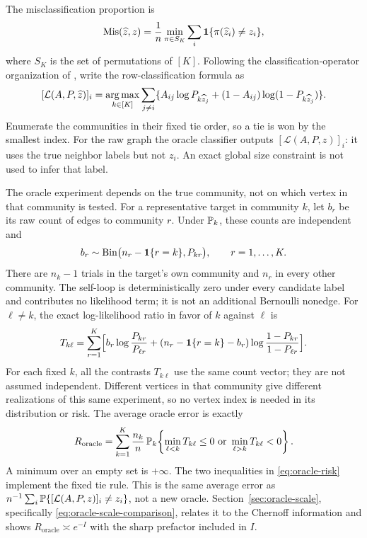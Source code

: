 The misclassification proportion is
\[
 \operatorname{Mis}(\widehat z,z)=\frac1n\min_{\pi\in S_K}
     \sum_i\mathbf1\{\pi(\widehat z_i)\ne z_i\},
\]
where $S_K$ is the set of permutations of $[K]$.
Following the classification-operator organization of \citet{zhouli},
write the row-classification formula as
\begin{equation}\label{eq:sbm-oracle}
 [\mathcal L(A,P,\widehat z)]_i
 =\operatorname*{arg\,max}_{k\in[K]}\sum_{j\ne i}
   \{A_{ij}\log P_{k\widehat z_j}+(1-A_{ij})\log(1-P_{k\widehat z_j})\}.
\end{equation}
Enumerate the communities in their fixed tie order, so a tie is won
by the smallest index. For the raw graph the oracle classifier outputs
$[\mathcal L(A,P,z)]_i$: it uses the true neighbor labels but not
$z_i$. An exact global size constraint is not used to infer that label.

The oracle experiment depends on the true community, not on which
vertex in that community is tested. For a representative target in
community $k$, let $b_{r}$ be its raw count of edges to community
$r$. Under $\mathbb P_k$, these counts are independent and
\[
 b_{r}\sim\operatorname{Bin}
       \bigl(n_{r}-\mathbf1\{r=k\},P_{kr}\bigr),
 \qquad r=1,\ldots,K.
\]
There are $n_k-1$ trials in the target's own community and $n_{r}$
in every other community. The self-loop is deterministically zero
under every candidate label and contributes no likelihood term; it
is not an additional Bernoulli nonedge. For $\ell\ne k$, the exact
log-likelihood ratio in favor of $k$ against $\ell$ is
\[
T_{k\ell}=\sum_{r=1}^K\Bigl[b_{r}\log\frac{P_{kr}}{P_{\ell r}}+(n_{r}-\mathbf1\{r=k\}-b_{r})\log\frac{1-P_{kr}}{1-P_{\ell r}}\Bigr].
\]
For each fixed $k$, all the contrasts $T_{k\ell}$ use the same count
vector; they are not assumed independent. Different vertices in that
community give different realizations of this same experiment, so no
vertex index is needed in its distribution or risk. The average oracle
error is exactly
\begin{equation}\label{eq:oracle-risk}
 R_{\mathrm{oracle}}
 =\sum_{k=1}^K\frac{n_k}{n}\,
   \PP_k\!\left\{
     \min_{\ell<k}T_{k\ell}\le0
     \ \text{or}\ 
     \min_{\ell>k}T_{k\ell}<0
   \right\}.
\end{equation}
A minimum over an empty set is $+\infty$. The two inequalities in
\eqref{eq:oracle-risk} implement the fixed tie rule. This is the same
average error as $n^{-1}\sum_i\mathbb P\{[\mathcal L(A,P,z)]_i\ne z_i\}$,
not a new oracle. Section~\ref{sec:oracle-scale}, specifically
\eqref{eq:oracle-scale-comparison}, relates it to the Chernoff
information and shows $R_{\mathrm{oracle}}\asymp e^{-I}$ with the
sharp prefactor included in $I$.

